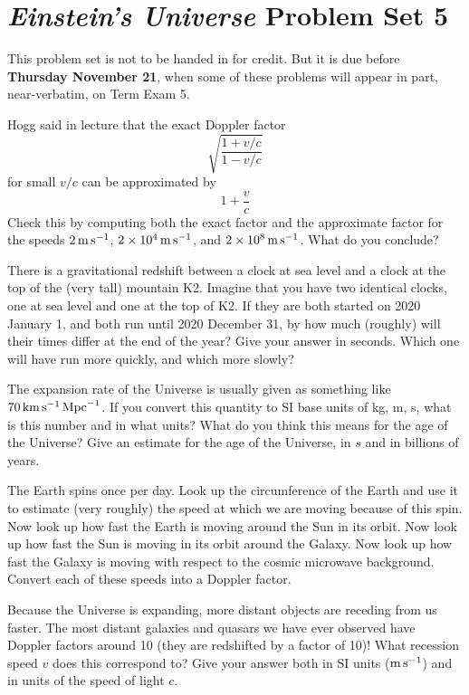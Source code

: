\documentclass[12pt, letterpaper]{article}
\begin{document}
\section*{\textsl{Einstein's Universe} Problem Set 5}

This problem set is not to be handed in for credit. But it is due
before \textbf{Thursday November 21}, when some of these problems
will appear in part, near-verbatim, on Term Exam 5.

\begin{problem}
Hogg said in lecture that the exact Doppler factor
\begin{equation}
\sqrt{\frac{1 + {v/c}}{1 - {v/c}}}
\end{equation}
for small $v/c$ can be approximated by
\begin{equation}
1 + \frac{v}{c}
\end{equation}
Check this by computing both the exact factor and the approximate factor for
the speeds $2\,\mathrm{m}\,\mathrm{s}^{-1}$, $2\times10^4\,\mathrm{m}\,\mathrm{s}^{-1}$, and $2\times 10^8\,\mathrm{m}\,\mathrm{s}^{-1}$.
What do you conclude?
\end{problem}

\begin{problem}
There is a gravitational redshift between a clock at sea level and a clock at the
top of the (very tall) mountain K2.
Imagine that you have two identical clocks, one at sea level and one at the top of K2.
If they are both started on 2020 January 1,
and both run until 2020 December 31, by how much (roughly) will their times differ
at the end of the year? Give your answer in seconds.
Which one will have run more quickly, and which more slowly?
\end{problem}

\begin{problem}
The expansion rate of the Universe is usually given as something like $70\,\mathrm{km}\,\mathrm{s}^{-1}\,\mathrm{Mpc}^{-1}$.
If you convert this quantity to SI base units of kg, m, s, what is this number and in what units?
What do you think this means for the age of the Universe?
Give an estimate for the age of the Universe, in $s$ and in billions of years.
\end{problem}

\begin{problem}
The Earth spins once per day. Look up the circumference of the Earth and use it to estimate
(very roughly) the speed at which we are moving because of this spin.
Now look up how fast the Earth is moving around the Sun in its orbit.
Now look up how fast the Sun is moving in its orbit around the Galaxy.
Now look up how fast the Galaxy is moving with respect to the cosmic microwave background.
Convert each of these speeds into a Doppler factor.
\end{problem}

\begin{problem}
Because the Universe is expanding, more distant objects are receding from us faster.
The most distant galaxies and quasars we have ever observed have Doppler factors
around 10 (they are redshifted by a factor of 10)!
What recession speed $v$ does this correspond to?
Give your answer both in SI units ($\mathrm{m}\,\mathrm{s}^{-1}$) and in units of the speed of light $c$.
\end{problem}
\end{document}
